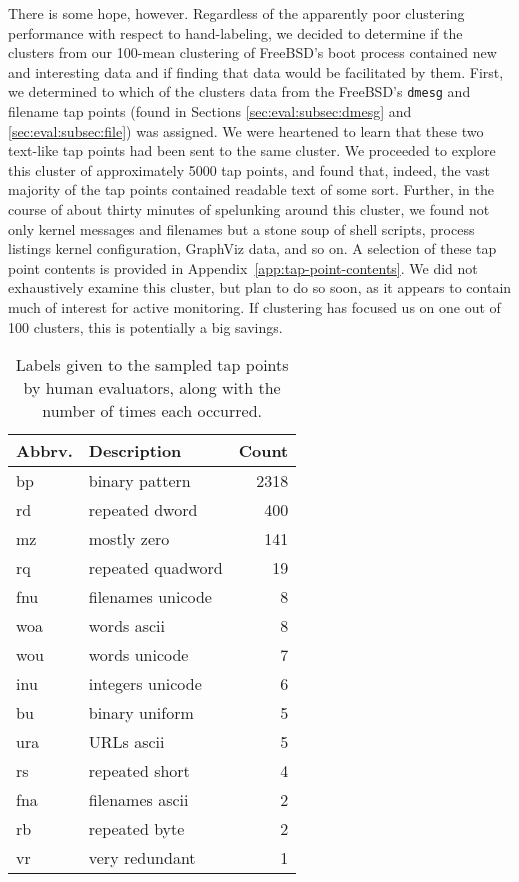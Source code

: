 There is some hope, however.  
Regardless of the apparently poor clustering performance with respect to 
hand-labeling, we decided to determine if the clusters from our 100-mean
clustering of FreeBSD's
boot process contained new and interesting data and if finding that data
would be facilitated by them.  
First, we determined to which of the clusters data from the
FreeBSD's \texttt{dmesg} and filename tap points (found in Sections
\ref{sec:eval:subsec:dmesg} and \ref{sec:eval:subsec:file}) was assigned.  
We were heartened to learn that these two text-like tap points 
had been sent to the same cluster.
We proceeded to explore this cluster of approximately 5000 tap points, 
and found that, indeed, the vast majority of the tap points contained 
readable text of some sort.  
Further, in the course of about thirty minutes of spelunking around this
cluster, we found not only kernel messages and filenames but a 
stone soup of shell scripts, process listings kernel configuration, 
GraphViz data, and so on.
A selection of these tap point contents is provided in 
Appendix~\ref{app:tap-point-contents}.
We did not exhaustively examine this cluster, but plan to do so soon,
as it appears to contain much of interest for active monitoring.
If clustering has focused us on one out of 100 clusters, this is 
potentially a big savings.

\begin{table}
    \centering
    \small
    \begin{tabular}{|l|l|r|}
        \hline
        Abbrv. & Description & Count \\
        \hline
        bp  &  binary pattern &  2318  \\
        rd  &  repeated dword &  400  \\
        mz  &  mostly zero &  141  \\
        rq  &  repeated quadword &  19  \\
        fnu  &  filenames unicode &  8  \\
        woa  &  words ascii &  8  \\
        wou  &  words unicode &  7  \\
        inu  &  integers unicode &  6  \\
        bu  &  binary uniform &  5  \\
        ura  &  URLs ascii &  5  \\
        rs  &  repeated short &  4  \\
        fna  &  filenames ascii &  2  \\
        rb  &  repeated byte &  2  \\
        vr  &  very redundant &  1  \\
        \hline
    \end{tabular}
\caption{Labels given to the sampled tap points by human evaluators,
along with the number of times each occurred.}
\label{tbl:clustlabels}
\end{table}

